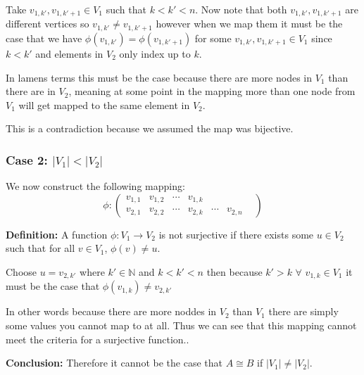 \documentclass{amsart}
\theoremstyle{definition}
\begin{document}
\begin{enumerate}
Take $v_{1,k'},v_{1,k'+1}\in V_1$ such that $k<k'<n$. Now note that both  $v_{1,k'},v_{1,k'+1}$ are different vertices so $v_{1,k'}\neq v_{1,k'+1}$ however when we map them it must be the case that we have $\phi(v_{1,k'})=\phi(v_{1,k'+1})$ for some $v_{1,k'},v_{1,k'+1}\in V_1$ since $k<k'$ and elements in $V_2$ only index up to $k$.

In lamens terms this must be the case because there are more nodes in $V_1$ than there are in $V_2$, meaning at some point in the mapping more than one node from $V_1$ will get mapped to the same element in $V_2$.\par
This is a contradiction because we assumed the map was bijective.
\subsubsection*{Case 2: \(|V_1| < |V_2|\)}

We now construct the following mapping:
\[
\phi:
\begin{pmatrix}
v_{1,1} & v_{1,2} & \cdots & v_{1,k} & & & \\
v_{2,1} & v_{2,2} & \cdots & v_{2,k} & \cdots & v_{2,n}
\end{pmatrix}
\]

\textbf{Definition:} A function \(\phi: V_1 \rightarrow V_2\) is not surjective if there exists some \(u \in V_2\) such that for all \(v \in V_1\), \(\phi(v) \ne u\).

Choose $u=v_{2,k'}$ where $k'\in \mathbb{N}$ and $k<k'<n$ then because $k'>k$ $\forall$ $v_{1,k}\in V_1$ it must be the case that $\phi(v_{1,k})\neq v_{2,k'}$

In other words because there are more noddes in $V_2$ than $V_1$ there are simply some values you cannot map to at all. Thus we can see that this mapping cannot meet the criteria for a surjective function..

\bigskip

\noindent
\textbf{Conclusion:} Therefore it cannot be the case that $A\cong B$  if \(|V_1| \ne |V_2|\).
\end{enumerate}
\end{document}
